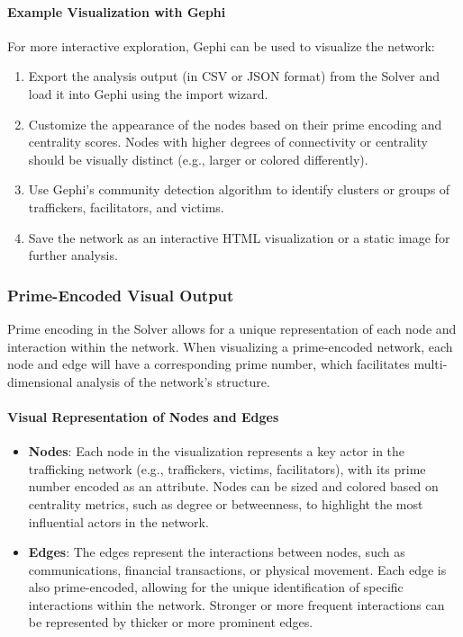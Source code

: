 \documentclass[%
 preprint, linenumbers,
 amsmath,amssymb,
 aps, physrev,
]{revtex4-2}
\begin{document}
\paragraph{Example Visualization with Gephi}

For more interactive exploration, Gephi can be used to visualize the network:

\begin{enumerate}
    \item Export the analysis output (in CSV or JSON format) from the Solver and load it into Gephi using the import wizard.
    \item Customize the appearance of the nodes based on their prime encoding and centrality scores. Nodes with higher degrees of connectivity or centrality should be visually distinct (e.g., larger or colored differently).
    \item Use Gephi’s community detection algorithm to identify clusters or groups of traffickers, facilitators, and victims.
    \item Save the network as an interactive HTML visualization or a static image for further analysis.
\end{enumerate}

\subsubsection{Prime-Encoded Visual Output}

Prime encoding in the Solver allows for a unique representation of each node and interaction within the network. When visualizing a prime-encoded network, each node and edge will have a corresponding prime number, which facilitates multi-dimensional analysis of the network’s structure.

\paragraph{Visual Representation of Nodes and Edges}

\begin{itemize}
    \item \textbf{Nodes}: Each node in the visualization represents a key actor in the trafficking network (e.g., traffickers, victims, facilitators), with its prime number encoded as an attribute. Nodes can be sized and colored based on centrality metrics, such as degree or betweenness, to highlight the most influential actors in the network.
    \item \textbf{Edges}: The edges represent the interactions between nodes, such as communications, financial transactions, or physical movement. Each edge is also prime-encoded, allowing for the unique identification of specific interactions within the network. Stronger or more frequent interactions can be represented by thicker or more prominent edges.
\end{itemize}
\end{document}
